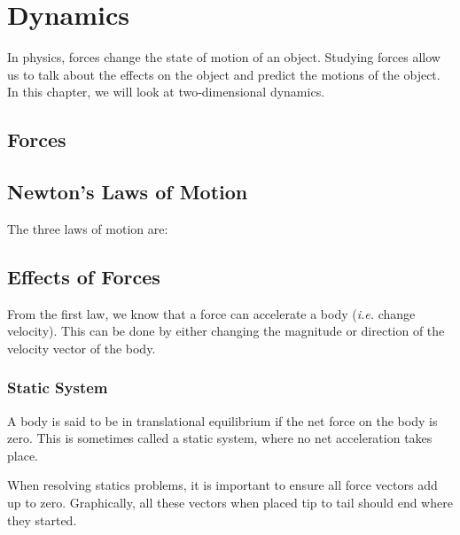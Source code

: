 \documentclass[../main.tex]{subfiles}
\begin{document}
	\section{Dynamics}
		\begin{preamb}
			In physics, forces change the state of motion of an object. Studying forces allow us to talk about the effects on the object and predict the motions of the object. In this chapter, we will look at two-dimensional dynamics.                         
		\end{preamb}
	
		\subsection{Forces}
		
		\subsection{Newton's Laws of Motion}
		The three laws of motion are:
		
		\subsection{Effects of Forces}
		From the first law, we know that a force can accelerate a body (\textit{i.e.} change velocity). This can be done by either changing the magnitude or direction of the velocity vector of the body.
			
			\subsubsection{Static System}
			A body is said to be in translational equilibrium if the net force on the body is zero. This is sometimes called a static system, where no net acceleration takes place.
			
			When resolving statics problems, it is important to ensure all force vectors add up to zero. Graphically, all these vectors when placed tip to tail should end where they started.
			
\end{document}

